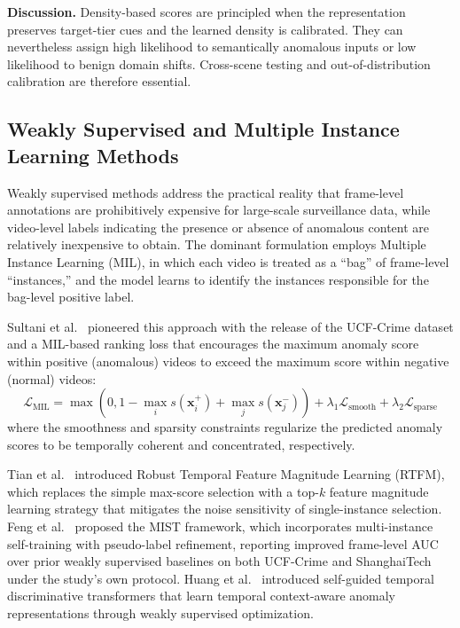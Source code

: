 \documentclass[10pt,a4paper]{article}
\begin{document}
\textbf{Discussion.} Density-based scores are principled when the representation preserves target-tier cues and the learned density is calibrated. They can nevertheless assign high likelihood to semantically anomalous inputs or low likelihood to benign domain shifts. Cross-scene testing and out-of-distribution calibration are therefore essential.

\subsection{Weakly Supervised and Multiple Instance Learning Methods}
\label{subsec:weakly_supervised}

Weakly supervised methods address the practical reality that frame-level annotations are prohibitively expensive for large-scale surveillance data, while video-level labels indicating the presence or absence of anomalous content are relatively inexpensive to obtain. The dominant formulation employs Multiple Instance Learning (MIL), in which each video is treated as a ``bag'' of frame-level ``instances,'' and the model learns to identify the instances responsible for the bag-level positive label.

Sultani et al.~\citeyearpar{sultani2018real} pioneered this approach with the release of the UCF-Crime dataset and a MIL-based ranking loss that encourages the maximum anomaly score within positive (anomalous) videos to exceed the maximum score within negative (normal) videos:
\begin{equation}
    \mathcal{L}_{\text{MIL}} = \max\left(0, 1 - \max_i s(\mathbf{x}_i^+) + \max_j s(\mathbf{x}_j^-)\right) + \lambda_1 \mathcal{L}_{\text{smooth}} + \lambda_2 \mathcal{L}_{\text{sparse}}
    \label{eq:mil_loss}
\end{equation}
where the smoothness and sparsity constraints regularize the predicted anomaly scores to be temporally coherent and concentrated, respectively.

Tian et al.~\citeyearpar{tian2021weakly} introduced Robust Temporal Feature Magnitude Learning (RTFM), which replaces the simple max-score selection with a top-$k$ feature magnitude learning strategy that mitigates the noise sensitivity of single-instance selection. Feng et al.~\citeyearpar{feng2021mist} proposed the MIST framework, which incorporates multi-instance self-training with pseudo-label refinement, reporting improved frame-level AUC over prior weakly supervised baselines on both UCF-Crime and ShanghaiTech under the study's own protocol. Huang et al.~\citeyearpar{wu2022self} introduced self-guided temporal discriminative transformers that learn temporal context-aware anomaly representations through weakly supervised optimization.
\end{document}
